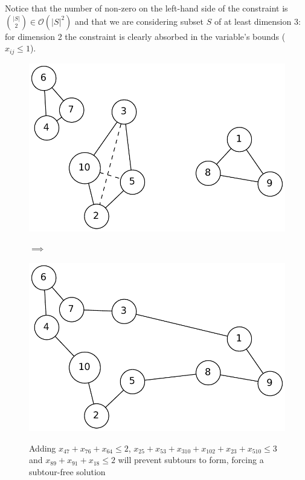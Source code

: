 Notice that the number of non-zero on the left-hand side of the constraint is
${|S|\choose 2} \in \mathcal{O}(|S|^2)$ and that we are considering subset $S$
of at least dimension 3: for dimension 2 the constraint is clearly absorbed in
the variable's bounds ($x_{ij} \le 1$).

\begin{figure}[h]
    \centering
    \begin{minipage}{.45\textwidth}
        \centering
        \includegraphics[width=0.8\linewidth]{figures/bendersa}
        \label{fig:sub1}
    \end{minipage}%
    \begin{minipage}{.1\textwidth}
        $\implies$
    \end{minipage}%
    \begin{minipage}{.45\textwidth}
        \centering
        \includegraphics[width=0.8\linewidth]{figures/bendersb}
        \label{fig:sub2}
    \end{minipage}
    \caption[Benders example]{\centering Adding $x_{47} + x_{76} + x_{64} \le 2$, $x_{25} + x_{53} +
    x_{310} + x_{102} + x_{23} + x_{510} \le 3$ and $x_{89} + x_{91} + x_{18} \le
    2$ will prevent subtours to form, forcing a subtour-free solution}
\end{figure}


